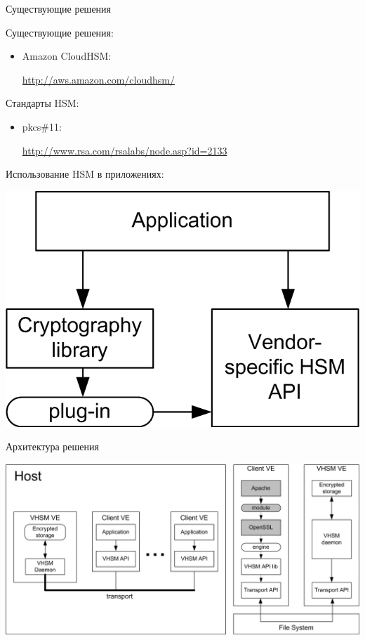 \documentclass[utf8, 11pt]{beamer}
\begin{document}
\begin{frame}{Существующие решения}

Существующие решения:
\begin{itemize}
\item Amazon CloudHSM:

\url{http://aws.amazon.com/cloudhsm/}
\end{itemize}

\vspace*{\fill}

Стандарты HSM:
\begin{itemize}
\item pkcs\#11:

\url{http://www.rsa.com/rsalabs/node.asp?id=2133}
\end{itemize}

\vspace*{\fill}

Использование HSM в приложениях:
\begin{center}
\includegraphics[scale=0.75]{img1-2}
\end{center}

\end{frame}

\begin{frame}{Архитектура решения}
\begin{center}
\includegraphics[width=0.95\paperwidth]{img2-3}

\end{center}
\end{frame}
\end{document}
